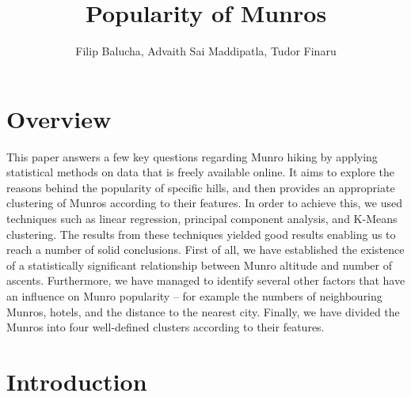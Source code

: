 \documentclass[11pt,a4paper]{article}
\title{Popularity of Munros}
\author{Filip Balucha, Advaith Sai Maddipatla, Tudor Finaru}
\begin{document}
\maketitle


\section{Overview}
This paper answers a few key questions regarding Munro hiking by applying statistical methods on data that is freely available online. It aims to explore the reasons behind the popularity of specific hills, and then provides an appropriate clustering of Munros according to their features. In order to achieve this, we used techniques such as linear regression, principal component analysis, and K-Means clustering. The results from these techniques yielded good results enabling us to reach a number of solid conclusions. First of all, we have established the existence of a statistically significant relationship between Munro altitude and number of ascents. Furthermore, we have managed to identify several other factors that have an influence on Munro popularity – for example the numbers of neighbouring Munros, hotels, and the distance to the nearest city. Finally, we have divided the Munros into four well-defined clusters according to their features.

\section{Introduction}
\end{document}
